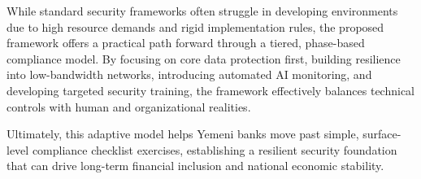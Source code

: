 \documentclass[12pt,a4paper,oneside]{report}
\begin{document}
	While standard security frameworks often struggle in developing environments due to high resource demands and rigid implementation rules, the proposed framework offers a practical path forward through a tiered, phase-based compliance model. By focusing on core data protection first, building resilience into low-bandwidth networks, introducing automated AI monitoring, and developing targeted security training, the framework effectively balances technical controls with human and organizational realities. 
	
	Ultimately, this adaptive model helps Yemeni banks move past simple, surface-level compliance checklist exercises, establishing a resilient security foundation that can drive long-term financial inclusion and national economic stability.
	
\end{document}
